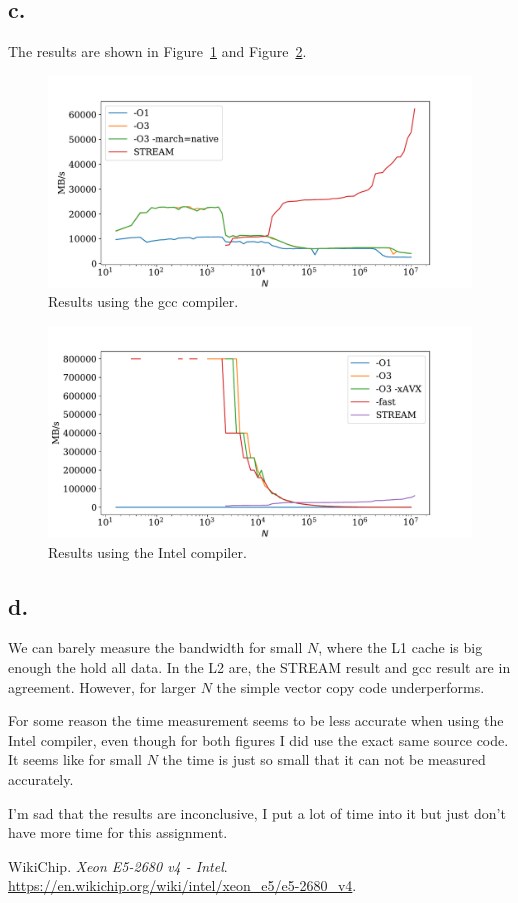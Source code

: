 \documentclass[a4paper, 11pt]{article}
\begin{document}
\subsection*{c.}
The results are shown in Figure~\ref{fig:2_gcc} and Figure~\ref{fig:2_icc}.
\begin{figure}
  \centering
  \includegraphics[width=\textwidth]{../plot/2/gcc.pdf}
  \caption{Results using the gcc compiler.}
  \label{fig:2_gcc}
\end{figure}
\begin{figure}
  \centering
  \includegraphics[width=\textwidth]{../plot/2/icc.pdf}
  \caption{Results using the Intel compiler.}
  \label{fig:2_icc}
\end{figure}

\subsection*{d.}
We can barely measure the bandwidth for small $N$, where the L1 cache is big
enough the hold all data. In the L2 are, the STREAM result and gcc result are
in agreement. However, for larger $N$ the simple vector copy code
underperforms.

For some reason the time measurement seems to be less accurate when using the
Intel compiler, even though for both figures I did use the exact same source
code. It seems like for small $N$ the time is just so small that it can not be
measured accurately.

I'm sad that the results are inconclusive, I put a lot of time into it but just
don't have more time for this assignment.

\begin{thebibliography}{9}
  WikiChip.
  \textit{Xeon E5-2680 v4 - Intel}.
  \href{https://en.wikichip.org/wiki/intel/xeon\_e5/e5-2680\_v4}
  {https://en.wikichip.org/wiki/intel/xeon\_e5/e5-2680\_v4}.
\end{thebibliography}
\end{document}
